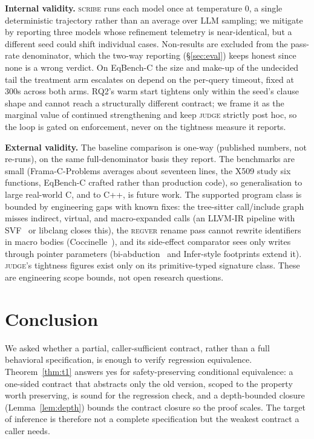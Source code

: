 \documentclass[conference]{IEEEtran}
\theoremstyle{definition}
\theoremstyle{remark}
\begin{document}
\textbf{Internal validity.} \textsc{scribe} runs each model once at
temperature $0$, a single deterministic trajectory rather than an average
over LLM sampling; we mitigate by reporting three models whose refinement
telemetry is near-identical, but a different seed could shift individual
cases. Non-results are excluded from the pass-rate denominator, which the
two-way reporting (\S\ref{sec:eval}) keeps honest since none is a wrong
verdict. On EqBench-C the size and make-up of the undecided tail the treatment
arm escalates on depend on the per-query timeout, fixed at 300s across both
arms. RQ2's warm start tightens only within the seed's clause shape and
cannot reach a structurally different contract; we frame it as the marginal
value of continued strengthening and keep \textsc{judge} strictly post hoc,
so the loop is gated on enforcement, never on the tightness measure it
reports.

\textbf{External validity.} The baseline comparison is one-way (published
numbers, not re-runs), on the same full-denominator basis they report. The
benchmarks are small (Frama-C-Problems averages about seventeen lines, the
X509 study six functions, EqBench-C crafted rather than production code), so
generalisation to large real-world C, and to C++, is future work. The
supported program class is bounded by engineering gaps with known fixes: the
tree-sitter call/include graph misses indirect, virtual, and macro-expanded
calls (an LLVM-IR pipeline with SVF~\cite{suixue2016svf} or libclang closes
this), the \textsc{regver} rename pass cannot rewrite identifiers in macro
bodies (Coccinelle~\cite{padioleau2008coccinelle}), and its side-effect
comparator sees only writes through pointer parameters
(bi-abduction~\cite{calcagno2009biabduction} and Infer-style footprints
extend it). \textsc{judge}'s tightness figures exist only on its
primitive-typed signature class. These are engineering scope bounds, not open
research questions.

\section{Conclusion}\label{sec:conclusion}

We asked whether a partial, caller-sufficient contract, rather than a
full behavioral specification, is enough to verify regression
equivalence. Theorem~\ref{thm:t1} answers yes for safety-preserving
conditional equivalence: a one-sided contract that abstracts only the
old version, scoped to the property worth preserving, is sound for the
regression check, and a depth-bounded closure (Lemma~\ref{lem:depth})
bounds the contract closure so the proof scales. The target of
inference is therefore not a
complete specification but the weakest contract a caller needs.
\end{document}
